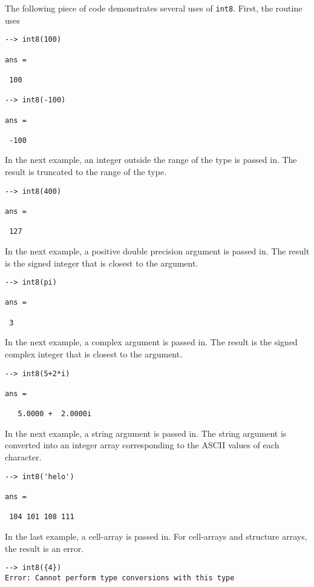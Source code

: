 The following piece of code demonstrates several uses of \verb|int8|.  First, the routine uses
\begin{verbatim}
--> int8(100)

ans = 

 100 

--> int8(-100)

ans = 

 -100 
\end{verbatim}
In the next example, an integer outside the range  of the type is passed in.  
The result is truncated to the range of the type.
\begin{verbatim}
--> int8(400)

ans = 

 127 
\end{verbatim}
In the next example, a positive double precision argument is passed in.  
The result is the signed integer that is closest to the argument.
\begin{verbatim}
--> int8(pi)

ans = 

 3 
\end{verbatim}
In the next example, a complex argument is passed in.  The result is the 
signed complex integer that is closest to the argument.
\begin{verbatim}
--> int8(5+2*i)

ans = 

   5.0000 +  2.0000i 
\end{verbatim}
In the next example, a string argument is passed in.  The string argument 
is converted into an integer array corresponding to the ASCII values of each character.
\begin{verbatim}
--> int8('helo')

ans = 

 104 101 108 111 
\end{verbatim}
In the last example, a cell-array is passed in.  For cell-arrays and 
structure arrays, the result is an error.
\begin{verbatim}
--> int8({4})
Error: Cannot perform type conversions with this type
\end{verbatim}
